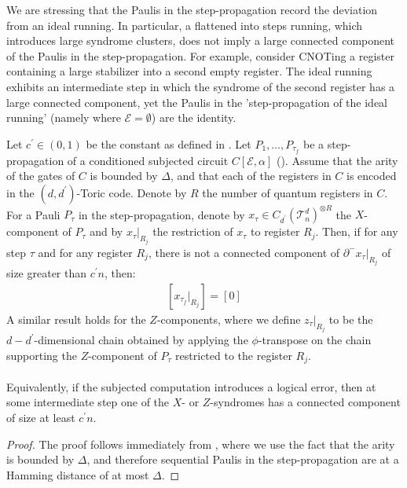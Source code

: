 We are stressing that the Paulis in the step-propagation record the deviation from an ideal running. In particular, a flattened into steps running, which introduces large syndrome clusters, does not imply a large connected component of the Paulis in the step-propagation. For example, consider CNOTing a register containing a large stabilizer into a second empty register. The ideal running exhibits an intermediate step in which the syndrome of the second register has a large connected component, yet the Paulis in the 'step-propagation of the ideal running' (namely where $\mathcal{E} = \emptyset$) are the identity.
\begin{corollary}
  \label{coro:barrier}
  Let $c^{\prime} \in (0,1)$ be the constant as defined in . Let $P_{1},\ldots,P_{\tau_{f}}$ be a step-propagation of a conditioned subjected circuit $C[\mathcal{E},\alpha]$ (). Assume that the arity of the gates of $C$ is bounded by $\Delta$, and that each of the registers in $C$ is encoded in the $(d,d^{\prime})$-Toric code. Denote by $R$ the number of quantum registers in $C$. For a Pauli $P_{\tau}$ in the step-propagation, denote by $x_{\tau} \in C_{d^{\prime}}(\mathcal{T}_n^d)^{\otimes R}$ the $X$-component of $P_{\tau}$ and by $x_{\tau}|_{R_{j}}$ the restriction of $x_{\tau}$ to register $R_{j}$. Then, if for any step $\tau$ and for any register $R_{j}$, there is not a connected component of $\partial^{-} x_{\tau}|_{R_{j}}$ of size greater than $c^{\prime}n$, then:
  \begin{equation*}
    \begin{split}
      [x_{\tau_{f}} |_{R_{j}}] = [0] 
    \end{split}
  \end{equation*}
A similar result holds for the $Z$-components, where we define $z_{\tau}|_{R_{j}}$ to be the $d-d^{\prime}$-dimensional chain obtained by applying the $\phi$-transpose on the chain supporting the $Z$-component of $P_{\tau}$ restricted to the register $R_{j}$.
\paragraph{}
Equivalently, if the subjected computation introduces a logical error, then at some intermediate step one of the $X$- or $Z$-syndromes has a connected component of size at least $c^{\prime}n$. 
\end{corollary}
\begin{proof}
The proof follows immediately from , where we use the fact that the arity is bounded by $\Delta$, and therefore sequential Paulis in the step-propagation are at a Hamming distance of at most $\Delta$.
\end{proof}




